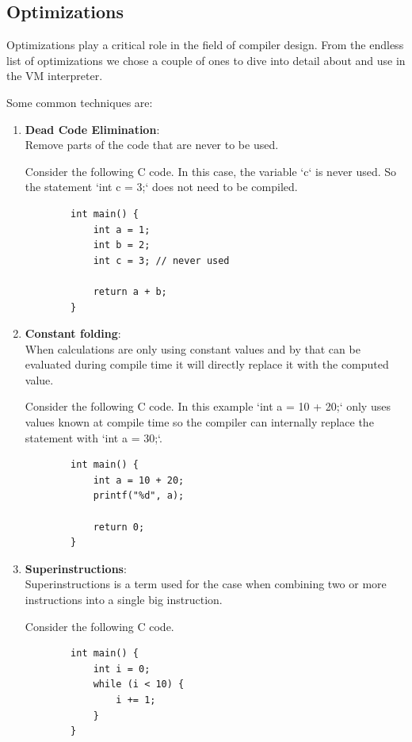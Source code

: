 \documentclass{article}
\begin{document}
\subsection{Optimizations}
Optimizations play a critical role in the field of compiler design. From the
endless list of optimizations we chose a couple of ones to dive into detail
about and use in the VM interpreter.

Some common techniques are:
\begin{enumerate}
    \item \textbf{Dead Code Elimination}:\\
    \label{item:dead_code_elimination}
        Remove parts of the code that are never to be used.

        Consider the following C code. In this case, the variable `c` is never
        used. So the statement `int c = 3;` does not need to be compiled.
        \begin{verbatim}
        int main() {
            int a = 1;
            int b = 2;
            int c = 3; // never used

            return a + b;
        }
        \end{verbatim}
    \item \textbf{Constant folding}:\\
        When calculations are only using constant values and by that can be
        evaluated during compile time it will directly replace it with the
        computed value.

        Consider the following C code. In this example `int a = 10 + 20;` only uses values known
        at compile time so the compiler can internally replace the statement with `int a = 30;`.
        \begin{verbatim}
        int main() {
            int a = 10 + 20;
            printf("%d", a);

            return 0;
        }
        \end{verbatim}
    \item \textbf{Superinstructions}:\\
        Superinstructions is a term used for the case when combining two or more instructions 
        into a single big instruction.

        Consider the following C code.

        \begin{verbatim}
        int main() {
            int i = 0;
            while (i < 10) {
                i += 1;
            }
        }
        \end{verbatim}


\end{enumerate}
\end{document}
